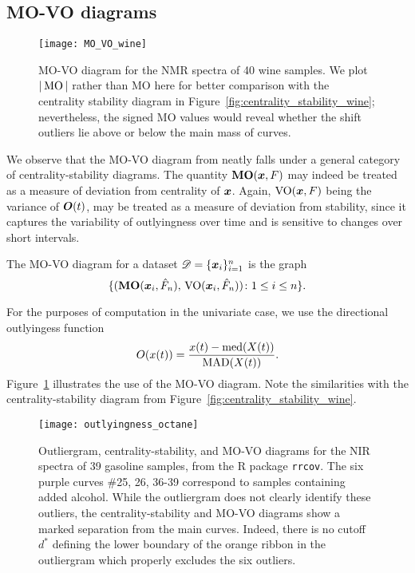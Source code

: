 \subsection{MO-VO diagrams}

\begin{figure}
    \centering
    \texttt{[image: MO\_VO\_wine]}
    \caption{
        MO-VO diagram for the NMR spectra of 40 wine samples.
        We plot $|\operatorname{MO}|$ rather than MO here for better comparison with the
        centrality stability diagram in
        Figure~\ref{fig:centrality_stability_wine}; nevertheless, the signed
        MO values would reveal whether the shift outliers lie above or below
        the main mass of curves.
    }
    \label{fig:MO_VO_wine}
\end{figure}

We observe that the MO-VO diagram from \textcite{dai-genton-2018} neatly falls
under a general category of centrality-stability diagrams.
The quantity $\operatorname{\textbf{MO}}(\bm{x}, F)$ may indeed be treated as a measure of deviation
from centrality of $\bm{x}$.
Again, $\operatorname{VO}(\bm{x}, F)$ being the variance of $\bm{O}(t)$, may be treated as a
measure of deviation from stability, since it captures the variability of
outlyingness over time and is sensitive to changes over short intervals.

\begin{definition}[MO-VO diagram]
    The MO-VO diagram for a dataset $\mathscr{D} = \{\bm{x}_i\}_{i = 1}^n$ is the
    graph
    \begin{equation}
        \{(\operatorname{\textbf{MO}}(\bm{x}_i, \hat{F}_n),\, \operatorname{VO}(\bm{x}_i, \hat{F}_n))\colon 1 \leq i \leq n\}.
    \end{equation}
\end{definition}


For the purposes of computation in the univariate case, we use the directional
outlyingess function
\begin{equation}
    O(x(t)) = \frac{x(t) - \operatorname{med}(X(t))}{\operatorname{MAD}(X(t))}.
\end{equation}
Figure~\ref{fig:MO_VO_wine} illustrates the use of the MO-VO diagram.
Note the similarities with the centrality-stability diagram from
Figure~\ref{fig:centrality_stability_wine}.




\begin{figure}
    \centering
    \texttt{[image: outlyingness\_octane]}
    \caption{
        Outliergram, centrality-stability, and MO-VO diagrams for the NIR
        spectra of 39 gasoline samples, from the R package \texttt{rrcov}.
        The six purple curves \#25, 26, 36-39 correspond to samples containing
        added alcohol.
        While the outliergram does not clearly identify these outliers, the
        centrality-stability and MO-VO diagrams show a marked separation from
        the main curves.
        Indeed, there is no cutoff $d^*$ defining the lower boundary of the
        orange ribbon in the outliergram which properly excludes the six
        outliers.
    }
    \label{fig:outlyingness_octane}
\end{figure}

